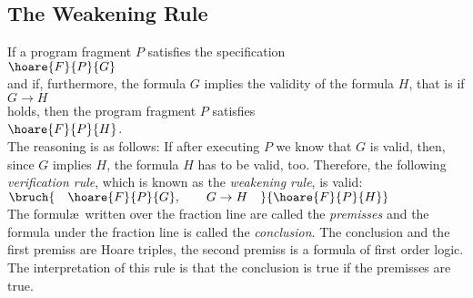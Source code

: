 \subsection{The Weakening Rule}
If a program fragment $P$ satisfies the specification
\\[0.2cm]
\hspace*{1.3cm}
$ \hoare{F}{P}{G} $
\\[0.2cm]
and if, furthermore, the formula $G$ implies the validity of the formula $H$, that is if
\\[0.2cm]
\hspace*{1.3cm}
$G \rightarrow H$
\\[0.2cm]
holds, then the program fragment $P$ satisfies
\\[0.2cm]
\hspace*{1.3cm}
$\hoare{F}{P}{H}$.
\\[0.2cm]
The reasoning is as follows:  If after executing $P$ we know that $G$
is valid, then, since $G$ implies $H$,  the formula $H$ has to be
valid, too.
Therefore, the  following \emph{verification rule}, which is known as the \emph{weakening rule}, is valid:
\\[0.4cm]
$\bruch{\quad \hoare{F}{P}{G}, \qquad G \rightarrow H \quad}{\hoare{F}{P}{H}}$ 
\\[0.2cm]
The formul\ae\ written over the fraction line are called the \emph{premisses} and the formula under the
fraction line is called the \emph{conclusion}.   The conclusion and the first premiss  are 
Hoare triples, the second premiss is a formula of first order logic.
The interpretation of this rule is that the conclusion is true if the premisses are true.


